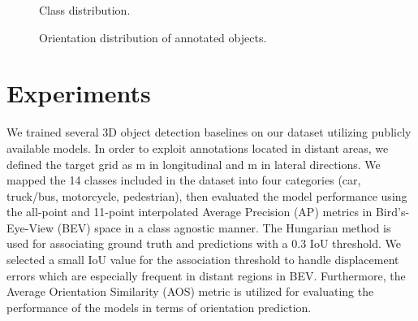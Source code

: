 \documentclass{article}
\begin{document}
\begin{figure}[t]
\begin{floatrow}
{\caption{Class distribution.}\label{fig:class_dist}
}
\end{floatrow}
\end{figure}

\begin{figure}[t]
\begin{floatrow}
{\caption{Orientation distribution of annotated objects.}\label{fig:orientation}
}
\end{floatrow}
\end{figure}

\section{Experiments}
\label{sec:experiments}
We trained several 3D object detection baselines on our dataset utilizing publicly available models. In order to exploit annotations located in distant areas, we defined the target grid as  m in longitudinal and  m in lateral directions. We mapped the 14 classes included in the dataset into four categories (car, truck/bus, motorcycle, pedestrian), then evaluated the model performance using the all-point and 11-point interpolated Average Precision (AP) metrics \citep{everingham2010pascal} in Bird's-Eye-View (BEV) space in a class agnostic manner. The Hungarian method \citep{kuhn1955hungarian} is used for associating ground truth and predictions with a 0.3 IoU threshold. We selected a small IoU value for the association threshold to handle displacement errors which are especially frequent in distant regions in BEV. Furthermore, the Average Orientation Similarity (AOS) \citep{geiger2012we} metric is utilized for evaluating the performance of the models in terms of orientation prediction. 
\end{document}
